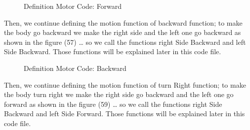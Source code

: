 \begin{figure}[h]
  \centering
  \hfill
  \caption{Definition Motor Code: Forward}
\end{figure}

Then, we continue defining the motion function of backward function; to make the body go backward we make the right side and the left one go backward as shown in the figure (57) … so we call the functions right Side Backward and left Side Backward. Those functions will be explained later in this code file.

\begin{figure}[h]
  \centering
  \hfill
  \caption{Definition Motor Code: Backward}
\end{figure}

\newpage

Then, we continue defining the motion function of turn Right function; to make the body turn right we make the right side go backward and the left one go forward as shown in the figure (59) … so we call the functions right Side Backward and left Side Forward. Those functions will be explained later in this code file.

